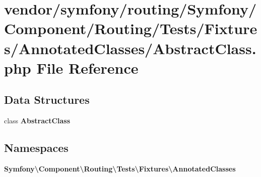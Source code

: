 \section{vendor/symfony/routing/\+Symfony/\+Component/\+Routing/\+Tests/\+Fixtures/\+Annotated\+Classes/\+Abstract\+Class.php File Reference}
\label{_abstract_class_8php}
\subsection*{Data Structures}
\begin{DoxyCompactItemize}
\item 
class {\bf Abstract\+Class}
\end{DoxyCompactItemize}
\subsection*{Namespaces}
\begin{DoxyCompactItemize}
\item 
 {\bf Symfony\textbackslash{}\+Component\textbackslash{}\+Routing\textbackslash{}\+Tests\textbackslash{}\+Fixtures\textbackslash{}\+Annotated\+Classes}
\end{DoxyCompactItemize}
